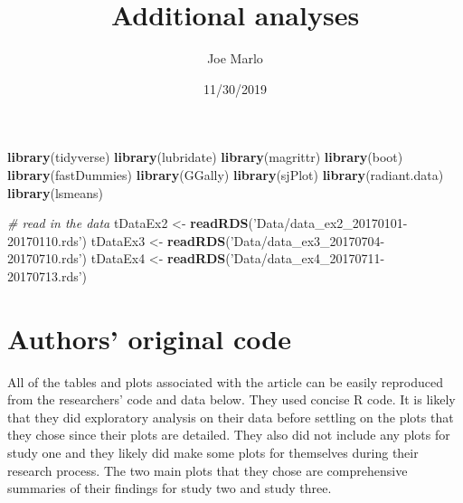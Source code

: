 \documentclass[]{article}
\title{Additional analyses}
\author{Joe Marlo}
\date{11/30/2019}
\newenvironment{Shaded}{\begin{snugshade}}{\end{snugshade}}
\newcommand{\CommentTok}[1]{\textcolor[rgb]{0.56,0.35,0.01}{\textit{#1}}}
\newcommand{\KeywordTok}[1]{\textcolor[rgb]{0.13,0.29,0.53}{\textbf{#1}}}
\newcommand{\NormalTok}[1]{#1}
\newcommand{\StringTok}[1]{\textcolor[rgb]{0.31,0.60,0.02}{#1}}
\begin{document}
\maketitle

\begin{Shaded}
\begin{Highlighting}[]
\KeywordTok{library}\NormalTok{(tidyverse)}
\KeywordTok{library}\NormalTok{(lubridate)}
\KeywordTok{library}\NormalTok{(magrittr)}
\KeywordTok{library}\NormalTok{(boot)}
\KeywordTok{library}\NormalTok{(fastDummies)}
\KeywordTok{library}\NormalTok{(GGally)}
\KeywordTok{library}\NormalTok{(sjPlot)}
\KeywordTok{library}\NormalTok{(radiant.data)}
\KeywordTok{library}\NormalTok{(lsmeans)}

\CommentTok{# read in the data}
\NormalTok{tDataEx2 <-}\StringTok{ }\KeywordTok{readRDS}\NormalTok{(}\StringTok{'Data/data_ex2_20170101-20170110.rds'}\NormalTok{)}
\NormalTok{tDataEx3 <-}\StringTok{ }\KeywordTok{readRDS}\NormalTok{(}\StringTok{'Data/data_ex3_20170704-20170710.rds'}\NormalTok{)}
\NormalTok{tDataEx4 <-}\StringTok{ }\KeywordTok{readRDS}\NormalTok{(}\StringTok{'Data/data_ex4_20170711-20170713.rds'}\NormalTok{)}
\end{Highlighting}
\end{Shaded}

\hypertarget{authors-original-code}{%
\section{Authors' original code}\label{authors-original-code}}

All of the tables and plots associated with the article can be easily
reproduced from the researchers' code and data below. They used concise
R code. It is likely that they did exploratory analysis on their data
before settling on the plots that they chose since their plots are
detailed. They also did not include any plots for study one and they
likely did make some plots for themselves during their research process.
The two main plots that they chose are comprehensive summaries of their
findings for study two and study three.
\end{document}
